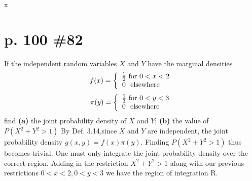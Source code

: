 x\documentclass[12pt]{article}
\begin{document}
	\section[20pt]{p. 100 \#82}
	If the independent random variables \(X\) and \(Y\) have the marginal densities
	\[f(x)=\left\{\begin{array}{ccc}
	\frac{1}{2}\textup{ for }0<x<2\\0\ \textup{ elsewhere}\ \ \ \ 
	\end{array}\right.\]
	\[\pi(y)=\left\{\begin{array}{ccc}
	\frac{1}{3}\textup{ for }0<y<3\\0\ \textup{ elsewhere}\ \ \ \ 
	\end{array}\right.\]
	find \newline
	\textbf{(a)} the joint probability density of \(X\) and \(Y\); \newline
	\textbf{(b)} the value of \(P(X^2+Y^2>1)\)
	\newline \newline
	By Def. 3.14,since \(X\) and \(Y\) are independent, the joint probability density \(g(x,y)=f(x)\pi(y)\). \newline
	 \newline \newline
	Finding \(P(X^2+Y^2>1)\) thus becomes trivial. One must only integrate the joint probability density over the correct region. Adding in the restriction \(X^2+Y^2>1\) along with our previous restrictions \(0<x<2,0<y<3\) we have the region of integration R.
\end{document}
